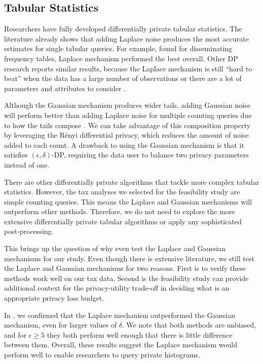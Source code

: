 \subsection{Tabular Statistics}
Researchers have fully developed differentially private tabular statistics. The literature already shows that adding Laplace noise produces the most accurate estimates for single tabular queries. For example, \citet{rinott2018confidentiality} found for disseminating frequency tables, Laplace mechanism performed the best overall. Other DP research reports similar results, because the Laplace mechanism is still ``hard to beat'' when the data has a large number of observations or there are a lot of parameters and attributes to consider \citep{bowen2021differentially,shlomo2018statistical,liu2018generalized}.

Although the Gaussian mechanism produces wider tails, adding Gaussian noise will perform better than adding Laplace noise for multiple counting queries due to how the tails compose \citet{wang2019subsampled}. We can take advantage of this composition property by leveraging the R\'enyi differential privacy, which reduces the amount of noise added to each count. A drawback to using the Gaussian mechanism is that it satisfies $(\epsilon,\delta)$-DP, requiring the data user to balance two privacy parameters instead of one.

There are other differentially private algorithms that tackle more complex tabular statistics. However, the tax analyses we selected for the feasibility study are simple counting queries. This means the Laplace and Gaussian mechanisms will outperform other methods. Therefore, we do not need to explore the more extensive differentially private tabular algorithms or apply any sophisticated post-processing.

This brings up the question of why even test the Laplace and Gaussian mechanisms for our study. Even though there is extensive literature, we still test the Laplace and Gaussian mechanisms for two reasons. First is to verify these methods work well on our tax data. Second is the feasibility study can provide additional context for the privacy-utility trade-off in deciding what is an appropriate privacy loss budget.

In \citet{barrientos2021}, we confirmed that the Laplace mechanism outperformed the Gaussian mechanism, even for larger values of $\delta$. We note that both methods are unbiased, and for $\epsilon \geq 5$ they both perform well enough that there is little difference between them. Overall, these results suggest the Laplace mechanism would perform well to enable researchers to query private histograms.


